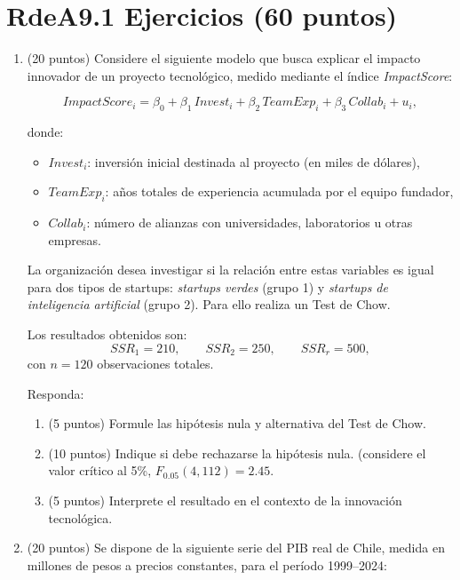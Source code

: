 \documentclass[10pt,a4paper]{article}
\begin{document}
\section{RdeA9.1 Ejercicios (60 puntos)}

\begin{enumerate}
    \item (20 puntos) Considere el siguiente modelo que busca explicar el impacto innovador de un proyecto tecnológico,
medido mediante el índice \textit{ImpactScore}:

\[
ImpactScore_i
= \beta_0 
+ \beta_1\, Invest_i
+ \beta_2\, TeamExp_i
+ \beta_3\, Collab_i
+ u_i,
\]

donde:
\begin{itemize}
    \item $Invest_i$: inversión inicial destinada al proyecto (en miles de dólares),
    \item $TeamExp_i$: años totales de experiencia acumulada por el equipo fundador,
    \item $Collab_i$: número de alianzas con universidades, laboratorios u otras empresas.
\end{itemize}

La organización desea investigar si la relación entre estas variables es igual para dos tipos de startups:
\textit{startups verdes} (grupo 1) y \textit{startups de inteligencia artificial} (grupo 2). Para ello realiza un Test de Chow.

Los resultados obtenidos son:
\[
SSR_1 = 210, \qquad SSR_2 = 250, \qquad SSR_r = 500,
\]
con $n = 120$ observaciones totales.

Responda:

\begin{enumerate}
    \item[(a)] (5 puntos) Formule las hipótesis nula y alternativa del Test de Chow.

    \item[(b)] (10 puntos) Indique si debe rechazarse la hipótesis nula. (considere el valor crítico al 5\%,
    $F_{0.05}(4,112)=2.45$.
    
    \item[(c)] (5 puntos) Interprete el resultado en el contexto de la innovación tecnológica.
\end{enumerate}

    \item (20 puntos) Se dispone de la siguiente serie del PIB real de Chile, medida en millones de pesos a precios constantes, para el período 1999--2024:


\end{enumerate}
\end{document}
